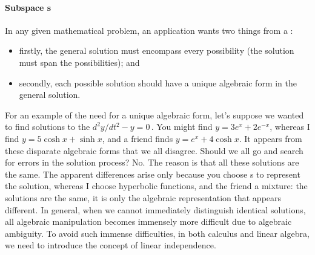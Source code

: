 \paragraph{Subspace s} 
In any given mathematical problem, an application wants two things from a : 
\begin{itemize}
\item firstly, the general solution must encompass every possibility (the solution must span the possibilities); and 
\item secondly, each possible solution should have a unique algebraic form in the general solution.
\end{itemize}
For an example of the need for a unique algebraic form, let's suppose we wanted to find solutions to the  \(d^2y/dt^2-y=0\)\,. 
You might find \(y=3e^x+2e^{-x}\), whereas I find \(y=5\cosh x+\sinh x\), and a friend finds \(y=e^x+4\cosh x\).
It appears from these disparate algebraic forms that we all disagree.
Should we all go and search for errors in the solution process?  No.
The reason is that all these solutions are the same.
The apparent differences arise only because you choose s to represent the solution, whereas I choose hyperbolic functions, and the friend a mixture: the solutions are the same, it is only the algebraic representation that appears different. 
In general, when we cannot immediately distinguish identical solutions, all algebraic manipulation becomes immensely more difficult due to algebraic ambiguity.
To avoid such immense difficulties, in both calculus and linear algebra, we need to introduce the concept of linear independence.

